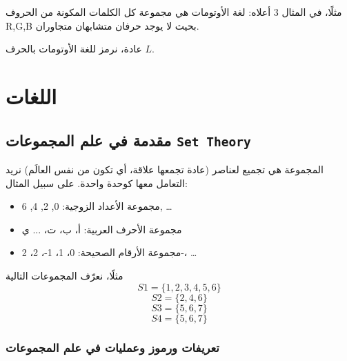 ﻿\documentclass[12pt]{article}
\begin{document}
مثلًا، في المثال 3 أعلاه: لغة الأوتومات هي مجموعة كل الكلمات المكونة من الحروف R,G,B بحيث لا يوجد حرفان متشابهان متجاوران.

عادة، نرمز للغة الأوتومات بالحرف $L$.

\section{اللغات}

\subsection{مقدمة في علم المجموعات \textenglish{\texttt{Set Theory}}}

المجموعة هي تجميع لعناصر  (عادة تجمعها علاقة، أي تكون من نفس العالَم) نريد التعامل معها كوحدة واحدة. على سبيل المثال:
\begin{itemize}
    \item مجموعة الأعداد الزوجية: {0, 2, 4, 6, \ldots}
    \item مجموعة الأحرف العربية: {أ، ب، ت، ... ي}
    \item مجموعة الأرقام الصحيحة: {0، 1، 1-، 2، 2-، \ldots}
\end{itemize}

مثلًا، نعرّف المجموعات التالية
$$S1 = \{ 1, 2, 3, 4, 5, 6 \}$$
$$S2 = \{ 2, 4, 6 \}$$
$$S3 = \{ 5, 6, 7 \}$$
$$S4 = \{ 5, 6, 7 \}$$

\subsubsection{تعريفات ورموز وعمليات في علم المجموعات}
\end{document}
